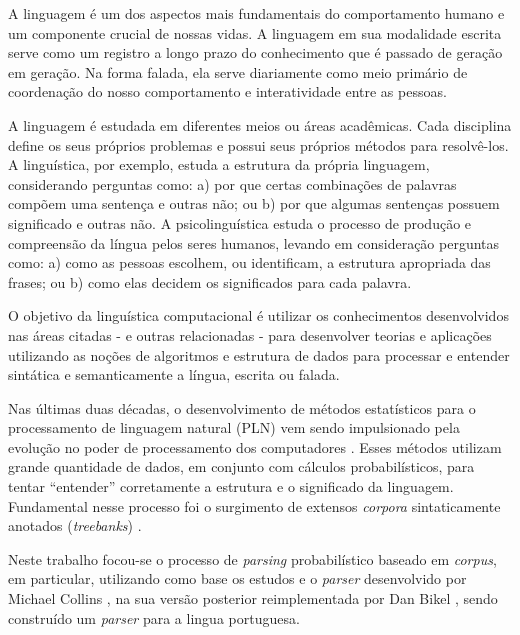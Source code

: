 A linguagem é um dos aspectos mais fundamentais do comportamento humano e um componente crucial de nossas vidas. A linguagem em sua modalidade escrita serve como um registro a longo prazo do conhecimento que é passado de geração em geração. Na forma falada, ela serve diariamente como meio primário de coordenação do nosso comportamento e interatividade entre as pessoas.

A linguagem  é estudada em diferentes meios ou áreas acadêmicas. Cada disciplina define os seus próprios problemas e possui seus próprios métodos para resolvê-los. A linguística, por exemplo, estuda a estrutura da própria linguagem, considerando perguntas como: a) por que certas combinações de palavras compõem uma sentença e outras não; ou b) por que algumas sentenças possuem significado e outras não. A psicolinguística estuda o processo de produção e compreensão da língua pelos seres humanos, levando em consideração perguntas como: a) como as pessoas escolhem, ou identificam, a estrutura apropriada das frases; ou b) como elas decidem os significados para cada palavra.

O objetivo da linguística computacional é utilizar os conhecimentos desenvolvidos nas áreas citadas - e outras relacionadas - para desenvolver teorias e aplicações utilizando as noções de algoritmos e estrutura de dados para processar e entender sintática e semanticamente a língua, escrita ou falada.

Nas últimas duas décadas, o desenvolvimento de métodos estatísticos para o processamento de linguagem natural (PLN) vem sendo impulsionado pela evolução no poder de processamento dos computadores \cite{manning99, jurafsky}. Esses métodos utilizam grande quantidade de dados, em conjunto com cálculos probabilísticos, para tentar ``entender'' corretamente a estrutura e o significado da linguagem. Fundamental nesse processo foi o surgimento de extensos \emph{corpora} sintaticamente anotados (\emph{treebanks}) \cite{marcus93,marcus94,abeille03,sardinha04}.

Neste trabalho focou-se o processo de \emph{parsing} probabilístico baseado em \emph{corpus}, em particular, utilizando como base os estudos e o \emph{parser} desenvolvido por Michael Collins \cite{collins99,collins97}, na sua versão posterior reimplementada por Dan Bikel \cite{bikel04}, sendo construído um \emph{parser} para a lingua portuguesa.



